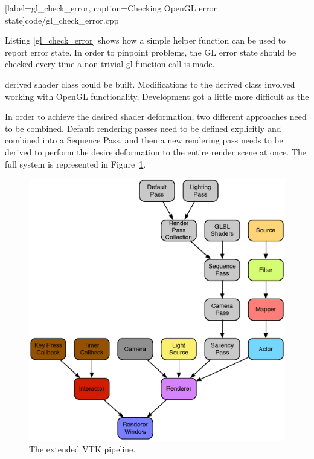 \documentclass[MSc,paper=a4,pagesize=auto]{icldt}
\begin{document}

  [label=gl_check_error, caption=Checking OpenGL error state]{code/gl_check_error.cpp}

Listing \ref{gl_check_error} shows how a simple helper function can be used to report error state. In order to pinpoint problems, the GL error state should be checked every time a non-trivial gl function call is made.





derived shader class could be built. Modifications to the derived class involved working with OpenGL functionality,  Development got a little more difficult as the 




In order to achieve the desired shader deformation, two different approaches need to be combined. Default rendering passes need to be defined explicitly and combined into a Sequence Pass, and then a new rendering pass needs to be derived to perform the desire deformation to the entire render scene at once. The full system is represented in Figure~\ref{fig:vtk_extended_pipeline}.

\begin{figure}[htbp!]
    \centering
    \includegraphics[width=1\textwidth]{resources/vtk_extended_pipeline}
    \caption{The extended VTK pipeline.}
    \label{fig:vtk_extended_pipeline}
\end{figure}
\end{document}
